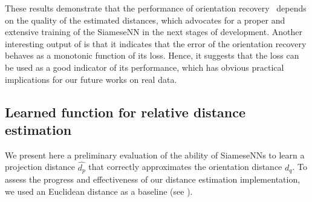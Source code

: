 These results demonstrate that the performance of orientation recovery~ depends on the quality of the estimated distances, which advocates for a proper and extensive training of the SiameseNN in the next stages of development.
Another interesting output of  is that it indicates that the error of the orientation recovery behaves as a monotonic function of its loss.
Hence, it suggests that the loss can be used as a good indicator of its performance, which has obvious practical implications for our future works on real data.


\subsection{Learned function for relative distance estimation }\label{sec:results:distance-estimation:learned}


We present here a preliminary evaluation of the ability of SiameseNNs to learn a projection distance $\widehat{d_p}$ that correctly approximates the orientation distance $d_q$.
To assess the progress and effectiveness of our distance estimation implementation, we used an Euclidean distance as a baseline (see ).


